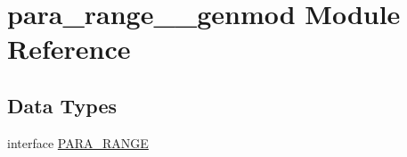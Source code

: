\hypertarget{namespacepara__range____genmod}{}\section{para\+\_\+range\+\_\+\+\_\+genmod Module Reference}
\label{namespacepara__range____genmod}
\subsection*{Data Types}
\begin{DoxyCompactItemize}
\item 
interface \mbox{\hyperlink{interfacepara__range____genmod_1_1_p_a_r_a___r_a_n_g_e}{P\+A\+R\+A\+\_\+\+R\+A\+N\+GE}}
\end{DoxyCompactItemize}
